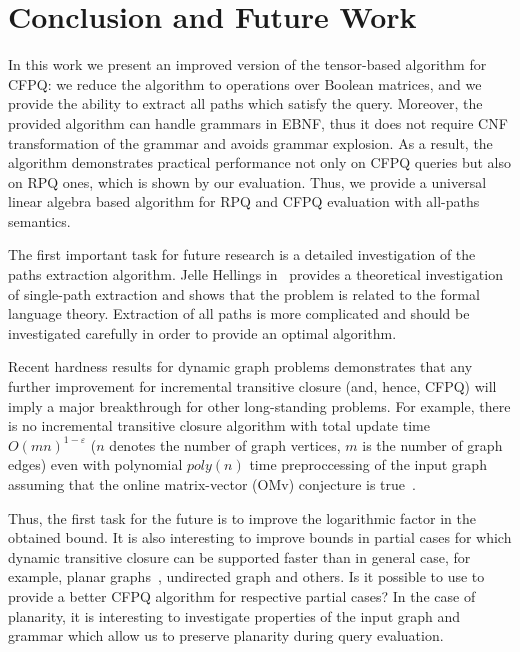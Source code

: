 \section{Conclusion and Future Work}

In this work we present an improved version of the tensor-based algorithm for CFPQ: we reduce the algorithm to operations over Boolean matrices, and we provide the ability to extract all paths which satisfy the query.
Moreover, the provided algorithm can handle grammars in EBNF, thus it does not require CNF transformation of the grammar and avoids grammar explosion.
As a result, the algorithm demonstrates practical performance not only on CFPQ queries but also on RPQ ones, which is shown by our evaluation.
Thus, we provide a universal linear algebra based algorithm for RPQ and CFPQ evaluation with all-paths semantics.

The first important task for future research is a detailed investigation of the paths extraction algorithm.
Jelle Hellings in~\cite{!!!} provides a theoretical investigation of single-path extraction and shows that the problem is related to the formal language theory.
Extraction of all paths is more complicated and should be investigated carefully in order to provide an optimal algorithm.


Recent hardness results for dynamic graph problems demonstrates that any further improvement for incremental transitive closure (and, hence, CFPQ)  will imply a major breakthrough for other long-standing problems. For example, there is no incremental transitive closure algorithm with total update time $O{(mn)}^{1-\varepsilon}$ ($n$ denotes the number of graph vertices, $m$ is the number of graph edges) even with polynomial $poly(n)$ time preproccessing of the input graph assuming that the online matrix-vector (OMv) conjecture is true~\cite{10.1145/2746539.2746609}.


Thus, the first task for the future is to improve the logarithmic factor in the obtained bound.
It is also interesting to improve bounds in partial cases for which dynamic transitive closure can be supported faster than in general case, for example, planar graphs~\cite{10.1007/3-540-57273-2_72}, undirected graph and others.
Is it possible to use  to provide a better CFPQ algorithm for respective partial cases?
In the case of planarity, it is interesting to investigate properties of the input graph and grammar which allow us to preserve planarity during query evaluation.

